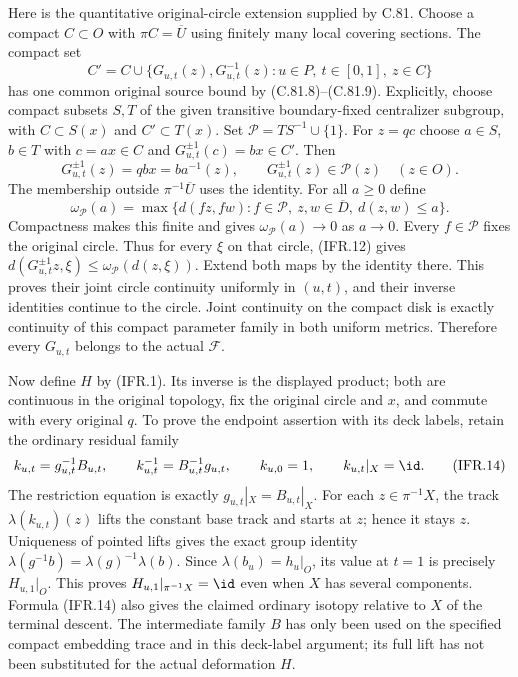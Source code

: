 Here is the quantitative original-circle extension supplied by C.81.
Choose a compact $C\subset O$ with $\pi C=\overline U$ using finitely
many local covering sections. The compact set
\[
 C'=C\cup\{G_{u,t}(z),G_{u,t}^{-1}(z):u\in P,\ t\in[0,1],\ z\in C\}
                                                               \tag{IFR.11}
\]
has one common original source bound by (C.81.8)--(C.81.9).
Explicitly, choose compact subsets $S,T$ of the given transitive
boundary-fixed centralizer subgroup, with $C\subset S(x)$ and
$C'\subset T(x)$. Set $\mathcal P=TS^{-1}\cup\{1\}$.
For $z=qc$ choose $a\in S$, $b\in T$ with
$c=ax\in C$ and $G_{u,t}^{\pm1}(c)=bx\in C'$. Then
\[
 G_{u,t}^{\pm1}(z)=qbx=ba^{-1}(z),\qquad
 G_{u,t}^{\pm1}(z)\in\mathcal P(z)\quad(z\in O).                \tag{IFR.12}
\]
The membership outside $\pi^{-1}\overline U$ uses the identity.
For all $a\geq0$ define
\[
 \omega_{\mathcal P}(a)=
 \max\{d(fz,fw):f\in\mathcal P,\ z,w\in\overline D,
                                                   \ d(z,w)\leq a\}.
                                                               \tag{IFR.13}
\]
Compactness makes this finite and gives $\omega_{\mathcal P}(a)\to0$
as $a\to0$. Every $f\in\mathcal P$ fixes the original circle.
Thus for every $\xi$ on that circle, (IFR.12) gives
$d(G_{u,t}^{\pm1}z,\xi)\leq\omega_{\mathcal P}(d(z,\xi))$.
Extend both maps by the identity there. This proves their joint
circle continuity uniformly in $(u,t)$, and their inverse identities
continue to the circle. Joint continuity on the compact disk is
exactly continuity of this compact parameter family in both uniform
metrics. Therefore every $G_{u,t}$ belongs to the actual $\mathscr F$.

Now define $H$ by (IFR.1). Its inverse is the displayed product;
both are continuous in the original topology, fix the original
circle and $x$, and commute with every original $q$.
To prove the endpoint assertion with its deck labels, retain the
ordinary residual family
\[
 k_{u,t}=g_{u,t}^{-1}B_{u,t},\qquad
 k_{u,t}^{-1}=B_{u,t}^{-1}g_{u,t},\qquad
 k_{u,0}=1,\qquad k_{u,t}|_X=\id.                              \tag{IFR.14}
\]
The restriction equation is exactly $g_{u,t}|_X=B_{u,t}|_X$.
For each $z\in\pi^{-1}X$, the track $\lambda(k_{u,t})(z)$
lifts the constant base track and starts at $z$; hence it stays $z$.
Uniqueness of pointed lifts gives the exact group identity
$\lambda(g^{-1}b)=\lambda(g)^{-1}\lambda(b)$.
Since $\lambda(b_u)=h_u|_O$, its value at $t=1$ is precisely
$H_{u,1}|_O$. This proves $H_{u,1}|_{\pi^{-1}X}=\id$ even when
$X$ has several components. Formula (IFR.14) also gives the claimed
ordinary isotopy relative to $X$ of the terminal descent.
The intermediate family $B$ has only been used on the specified
compact embedding trace and in this deck-label argument; its full
lift has not been substituted for the actual deformation $H$.

